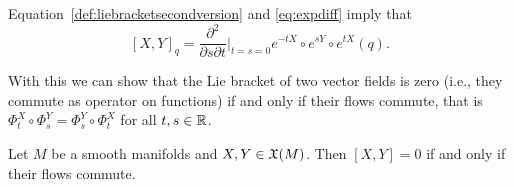 \begin{remark}
  Equation~\eqref{def:liebracketsecondversion} and \eqref{eq:expdiff} imply that
  \begin{equation}\label{eq:lbddr}
    [X,Y]_q = \frac{\partial^2}{\partial s \partial t}\Big|_{t=s=0}e^{-tX}\circ e^{sY}\circ e^{t X}(q).
  \end{equation}
\end{remark}

With this we can show that the Lie bracket of two vector fields is zero (i.e., they commute as operator on functions) if and only if their flows commute, that is $\Phi^X_t \circ \Phi^Y_s = \Phi^Y_s\circ \Phi^X_t$ for all $t,s\in\mathbb{R}$.

\begin{proposition}
  Let $M$ be a smooth manifolds and $X,Y\in\mathfrak{X}(M)$. Then $[X,Y]=0$ if and only if their flows commute.
\end{proposition}
